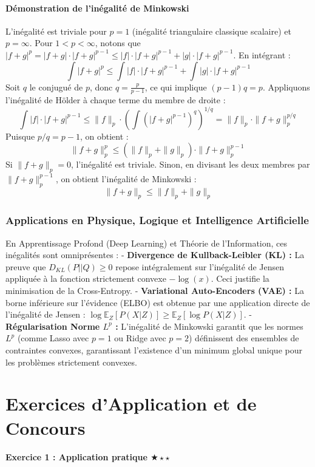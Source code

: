 \documentclass[11pt,a4paper]{article}
\begin{document}
\subsection{Démonstration de l'inégalité de Minkowski}
L'inégalité est triviale pour $p=1$ (inégalité triangulaire classique scalaire) et $p=\infty$.
Pour $1 < p < \infty$, notons que $|f+g|^p = |f+g| \cdot |f+g|^{p-1} \le |f| \cdot |f+g|^{p-1} + |g| \cdot |f+g|^{p-1}$.
En intégrant :
$$ \int |f+g|^p \le \int |f| \cdot |f+g|^{p-1} + \int |g| \cdot |f+g|^{p-1} $$
Soit $q$ le conjugué de $p$, donc $q = \frac{p}{p-1}$, ce qui implique $(p-1)q = p$.
Appliquons l'inégalité de Hölder à chaque terme du membre de droite :
$$ \int |f| \cdot |f+g|^{p-1} \le \|f\|_p \cdot \left( \int (|f+g|^{p-1})^q \right)^{1/q} = \|f\|_p \cdot \|f+g\|_p^{p/q} $$
Puisque $p/q = p-1$, on obtient :
$$ \|f+g\|_p^p \le (\|f\|_p + \|g\|_p) \cdot \|f+g\|_p^{p-1} $$
Si $\|f+g\|_p = 0$, l'inégalité est triviale. Sinon, en divisant les deux membres par $\|f+g\|_p^{p-1}$, on obtient l'inégalité de Minkowski :
$$ \|f+g\|_p \le \|f\|_p + \|g\|_p $$

\section{Applications en Physique, Logique et Intelligence Artificielle}

En Apprentissage Profond (Deep Learning) et Théorie de l'Information, ces inégalités sont omniprésentes :
- \textbf{Divergence de Kullback-Leibler (KL) :} La preuve que $D_{KL}(P || Q) \ge 0$ repose intégralement sur l'inégalité de Jensen appliquée à la fonction strictement convexe $-\log(x)$. Ceci justifie la minimisation de la Cross-Entropy.
- \textbf{Variational Auto-Encoders (VAE) :} La borne inférieure sur l'évidence (ELBO) est obtenue par une application directe de l'inégalité de Jensen : $\log \mathbb{E}_{Z}[P(X|Z)] \ge \mathbb{E}_{Z}[\log P(X|Z)]$.
- \textbf{Régularisation Norme $L^p$ :} L'inégalité de Minkowski garantit que les normes $L^p$ (comme Lasso avec $p=1$ ou Ridge avec $p=2$) définissent des ensembles de contraintes convexes, garantissant l'existence d'un minimum global unique pour les problèmes strictement convexes.


\newpage
\part{Exercices d'Application et de Concours}
\subsection*{Exercice 1 : Application pratique $\bigstar\star\star$}
\end{document}
